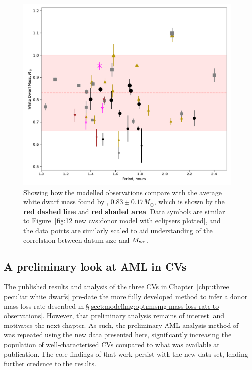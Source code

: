 \begin{figure}
    \centering
    \includegraphics[width=\textwidth]{figures/results/Modelled_Mwd_vs_Period.pdf}
    \caption{Showing how the modelled observations compare with the average white dwarf mass found by \citet{pala2020}, $0.83\pm0.17 M_\odot$, which is shown by the {\bf red dashed line} and {\bf red shaded area}. Data symbols are similar to Figure~\ref{fig:12 new cvs:donor model with eclipsers plotted}, and the data points are similarly scaled to aid understanding of the correlation between datum size and $M_{\rm wd}$.}
    \label{fig:12 new cvs:white dwarf masses vs period}
\end{figure}



\subsection{A preliminary look at AML in CVs}
\label{sect:12 new cvs:period excess}

The published results and analysis of the three CVs in Chapter~\ref{chpt:three peculiar white dwarfs} \citep{wild2021} pre-date the more fully developed method to infer a donor mass loss rate described in \S\ref{sect:modelling:optimising mass loss rate to observations}. However, that preliminary analysis remains of interest, and motivates the next chapter.
As such, the preliminary AML analysis method of \citet{wild2021} was repeated using the new data presented here, significantly increasing the population of well-characterised CVs compared to what was available at publication. The core findings of that work persist with the new data set, lending further credence to the results.

